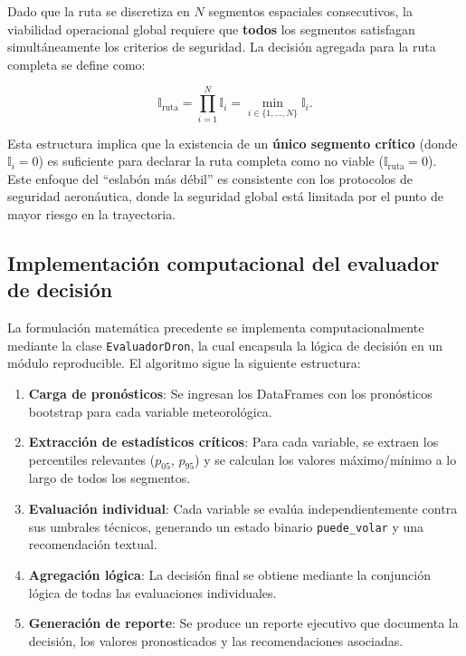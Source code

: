 \documentclass[
  spanish,
  us-letterpaper,
]{scrreprt}
\providecommand{\tightlist}{%
  \setlength{\itemsep}{0pt}\setlength{\parskip}{0pt}}
\numberwithin{equation}{section}
\begin{document}
Dado que la ruta se discretiza en \(N\) segmentos espaciales
consecutivos, la viabilidad operacional global requiere que
\textbf{todos} los segmentos satisfagan simultáneamente los criterios de
seguridad. La decisión agregada para la ruta completa se define como:

\[
\mathbb{I}_{\text{ruta}} = \prod_{i=1}^{N} \mathbb{I}_i = \min_{i \in \{1,\dots,N\}} \mathbb{I}_i.
\]

Esta estructura implica que la existencia de un \textbf{único segmento
crítico} (donde \(\mathbb{I}_i = 0\)) es suficiente para declarar la
ruta completa como no viable (\(\mathbb{I}_{\text{ruta}} = 0\)). Este
enfoque del ``eslabón más débil'' es consistente con los protocolos de
seguridad aeronáutica, donde la seguridad global está limitada por el
punto de mayor riesgo en la trayectoria.

\subsection{Implementación computacional del evaluador de
decisión}\label{implementaciuxf3n-computacional-del-evaluador-de-decisiuxf3n}

La formulación matemática precedente se implementa computacionalmente
mediante la clase \texttt{EvaluadorDron}, la cual encapsula la lógica de
decisión en un módulo reproducible. El algoritmo sigue la siguiente
estructura:

\begin{enumerate}
\def\labelenumi{\arabic{enumi}.}
\tightlist
\item
  \textbf{Carga de pronósticos}: Se ingresan los DataFrames con los
  pronósticos bootstrap para cada variable meteorológica.
\item
  \textbf{Extracción de estadísticos críticos}: Para cada variable, se
  extraen los percentiles relevantes (\(p_{05}\), \(p_{95}\)) y se
  calculan los valores máximo/mínimo a lo largo de todos los segmentos.
\item
  \textbf{Evaluación individual}: Cada variable se evalúa
  independientemente contra sus umbrales técnicos, generando un estado
  binario \texttt{puede\_volar} y una recomendación textual.
\item
  \textbf{Agregación lógica}: La decisión final se obtiene mediante la
  conjunción lógica de todas las evaluaciones individuales.
\item
  \textbf{Generación de reporte}: Se produce un reporte ejecutivo que
  documenta la decisión, los valores pronosticados y las recomendaciones
  asociadas.
\end{enumerate}
\end{document}
